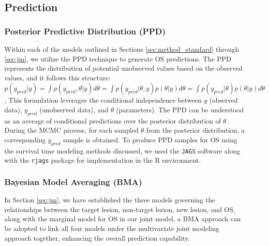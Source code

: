 \subsection{Prediction}

\subsubsection{Posterior Predictive Distribution (PPD)}
Within each of the models outlined in Sections \ref{sec:method_standard} through \ref{sec:jm}, we utilize the \ac{PPD} technique \citep{gelman2014bayesian} to generate \ac{OS} predictions. The \ac{PPD} represents the distribution of potential unobserved values based on the observed values, and it follows this structure:
$p(y_{pred}|y) = \int{p(y_{pred},\theta|y)d\theta} = \int{p(y_{pred}|\theta,y)p(\theta|y)d\theta} = \int{p(y_{pred}|\theta)p(\theta|y)d\theta}$,
This formulation leverages the conditional independence between $y$ (observed data), $y_{pred}$ (unobserved data), and $\theta$ (parameters). The \ac{PPD} can be understood as an average of conditional predictions over the posterior distribution of $\theta$. During the \ac{MCMC}  process, for each sampled $\theta$ from the posterior distribution, a corresponding $y_{pred}$ sample is obtained. To produce \ac{PPD} samples for \ac{OS} using the survival time modeling methods discussed, we used the \texttt{JAGS} software \citep{plummer2017jags} along with the \texttt{rjags} package for implementation in the R environment.

\subsubsection{Bayesian Model Averaging (BMA)}
In Section \ref{sec:jm}, we have established the three models governing the relationships between the target lesion, non-target lesion, new lesion, and OS, along with the marginal model for \ac{OS} in our joint model, a \ac{BMA} approach can be adopted to link all four models under the multivariate joint modeling approach together, enhancing the overall prediction capability.

